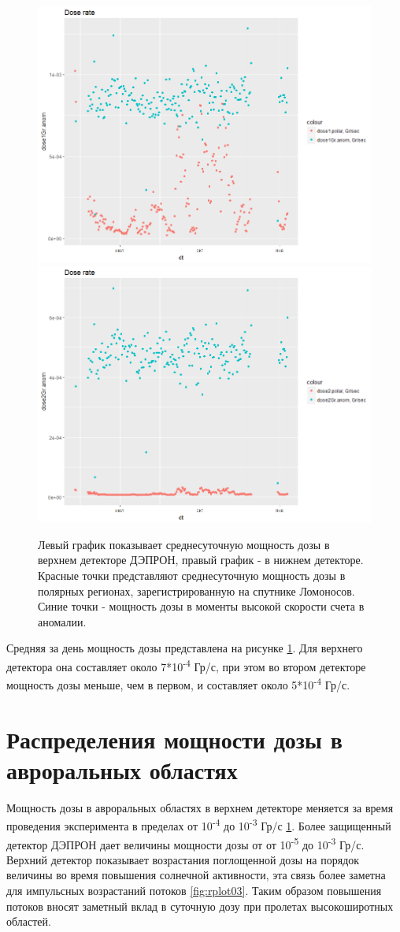\begin{figure}
	\centering
	\includegraphics[width=0.49\linewidth]{images/doseanalisys/det1}
	\includegraphics[width=0.49\linewidth]{images/doseanalisys/det2}
	\caption{ Левый график показывает среднесуточную мощность дозы в верхнем детекторе ДЭПРОН, правый график - в нижнем детекторе. Красные точки представляют среднесуточную мощность дозы в полярных регионах, зарегистрированную на спутнике Ломоносов. Синие точки - мощность дозы в моменты высокой скорости счета в аномалии.}
	\label{fig:doseanom}
\end{figure}

Средняя за день мощность дозы  представлена на рисунке \ref{fig:doseanom}. Для верхнего детектора она составляет около 7*10\textsuperscript{-4} Гр/с, при этом во втором детекторе мощность дозы меньше, чем в первом,  и составляет около 5*10\textsuperscript{-4} Гр/с. 

\section{Распределения мощности дозы в авроральных областях}

Мощность дозы в авроральных областях  в верхнем детекторе меняется за время проведения эксперимента в пределах от 10\textsuperscript{-4}  до 10\textsuperscript{-3} Гр/с  \ref{fig:doseanom}. Более защищенный детектор ДЭПРОН дает величины мощности дозы от  от 10\textsuperscript{-5}  до 10\textsuperscript{-3} Гр/с. Верхний детектор показывает возрастания поглощенной дозы на порядок величины во время повышения солнечной активности, эта связь более заметна для импульсных возрастаний потоков \ref{fig:rplot03}. Таким образом повышения потоков вносят заметный вклад в суточную дозу при пролетах высокоширотных областей.


